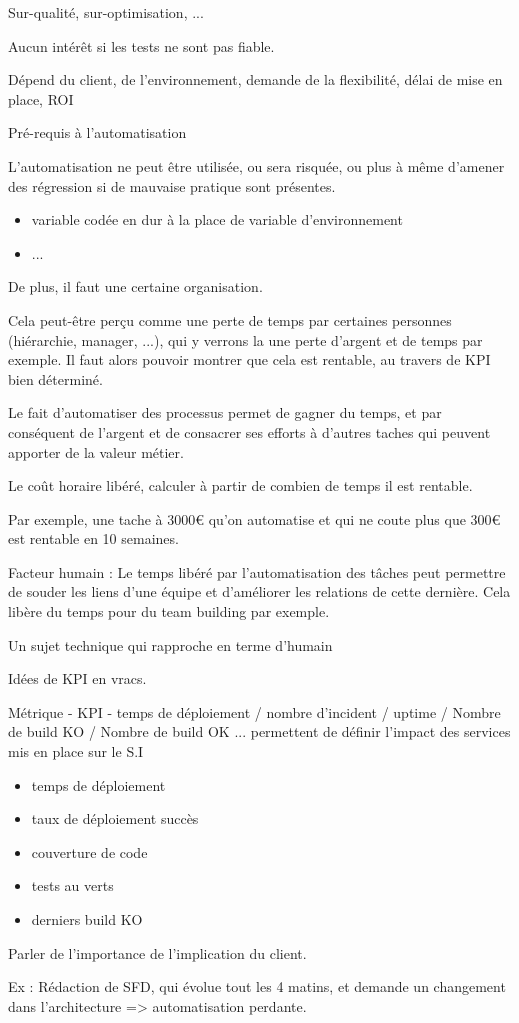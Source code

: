 
Sur-qualité, sur-optimisation, ...

Aucun intérêt si les tests ne sont pas fiable.

Dépend du client, de l'environnement, demande de la flexibilité, délai de mise en place, ROI

Pré-requis à l'automatisation

L'automatisation ne peut être utilisée, ou sera risquée, ou plus à même d'amener des régression si de mauvaise pratique sont présentes.

\begin{itemize}
	\item variable codée en dur à la place de variable d'environnement
	\item ...
\end{itemize}

De plus, il faut une certaine organisation.

Cela peut-être perçu comme une perte de temps par certaines personnes (hiérarchie, manager, ...), qui y verrons la une perte d'argent et de temps par exemple. Il faut alors pouvoir montrer que cela est rentable, au travers de \gls{KPI} bien déterminé.

Le fait d'automatiser des processus permet de gagner du temps, et par conséquent de l'argent et de consacrer ses efforts à d'autres taches qui peuvent apporter de la valeur métier.

Le coût horaire libéré, calculer à partir de combien de temps il est rentable.

Par exemple, une tache à 3000€ qu'on automatise et qui ne coute plus que 300€ est rentable en 10 semaines.

Facteur humain : Le temps libéré par l'automatisation des tâches peut permettre de souder les liens d'une équipe et d'améliorer les relations de cette dernière. Cela libère du temps pour du team building par exemple.

Un sujet technique qui rapproche en terme d'humain

Idées de \gls{KPI} en vracs.

Métrique - KPI - temps de déploiement / nombre d'incident / uptime / Nombre de build KO / Nombre de build OK ... permettent de définir l'impact des services mis en place sur le S.I

\begin{itemize}
	\item temps de déploiement
	\item taux de déploiement succès
	\item couverture de code
	\item tests au verts
	\item derniers build KO
\end{itemize}

Parler de l'importance de l'implication du client. 

Ex :  Rédaction de SFD, qui évolue tout les 4 matins, et demande un changement dans l'architecture => automatisation perdante.

